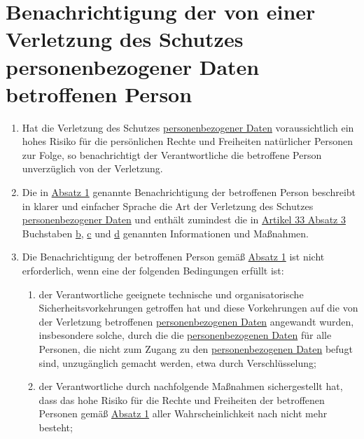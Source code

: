 \chapter{Benachrichtigung der von einer Verletzung des Schutzes personenbezogener Daten betroffenen Person}
\label{ch:34}


\begin{enumerate}

  \item Hat die Verletzung des Schutzes \hyperref[itm:04-1]{personenbezogener Daten} voraussichtlich ein hohes Risiko für die persönlichen
   Rechte und Freiheiten natürlicher Personen zur Folge, so benachrichtigt der Verantwortliche die betroffene Person
   unverzüglich von der Verletzung.
  \label{itm:34-1}

  \item Die in \hyperref[itm:34-1]{Absatz 1} genannte Benachrichtigung der betroffenen Person beschreibt in klarer und
   einfacher Sprache die Art der Verletzung des Schutzes \hyperref[itm:04-1]{personenbezogener Daten} und enthält zumindest die in
   \hyperref[itm:33-3]{Artikel 33 Absatz 3} Buchstaben \hyperref[itm:33-3b]{b}, \hyperref[itm:33-3c]{c} und \hyperref
    [itm:33-3d]{d} genannten Informationen und Maßnahmen.
  \label{itm:34-2}

  \item Die Benachrichtigung der betroffenen Person gemäß \hyperref[itm:34-1]{Absatz 1} ist nicht erforderlich, wenn eine der folgenden
   Bedingungen erfüllt ist:
  \label{itm:34-3}

  \begin{enumerate}
  
    \item der Verantwortliche geeignete technische und organisatorische Sicherheitsvorkehrungen getroffen hat und diese
     Vorkehrungen auf die von der Verletzung betroffenen \hyperref[itm:04-1]{personenbezogenen Daten} angewandt wurden, insbesondere solche,
     durch die die \hyperref[itm:04-1]{personenbezogenen Daten} für alle Personen, die nicht zum Zugang zu den \hyperref[itm:04-1]{personenbezogenen Daten}
     befugt sind, unzugänglich gemacht werden, etwa durch Verschlüsselung;
    \label{itm:34-3a}

    \item der Verantwortliche durch nachfolgende Maßnahmen sichergestellt hat, dass das hohe Risiko für die Rechte und
     Freiheiten der betroffenen Personen gemäß \hyperref[itm:34-1]{Absatz 1} aller Wahrscheinlichkeit nach nicht mehr
     besteht;
    \label{itm:34-3b}


\end{enumerate}
\end{enumerate}
